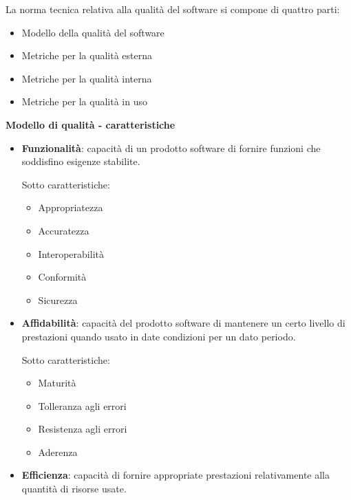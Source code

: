 		La norma tecnica relativa alla qualità del software si compone di quattro parti:
		\begin{itemize}
		
			\item Modello della qualità del software
			\item Metriche per la qualità esterna
			\item Metriche per la qualità interna
			\item Metriche per la qualità in uso
			
		\end{itemize}
		
		\textbf{Modello di qualità - caratteristiche}
		
		\begin{itemize}
		
			\item \textbf{Funzionalità}: capacità di un prodotto software di fornire funzioni che soddisfino esigenze stabilite.
			
			Sotto caratteristiche:
			
			\begin{itemize}
			
				\item Appropriatezza
				\item Accuratezza
				\item Interoperabilità
				\item Conformità
				\item Sicurezza

			\end{itemize}

		\item \textbf{Affidabilità}: capacità del prodotto software di mantenere un certo livello di prestazioni quando usato in date condizioni per un dato periodo.
		
			Sotto caratteristiche:
			
			\begin{itemize}
			
				\item Maturità
				\item Tolleranza agli errori
				\item Resistenza agli errori
				\item Aderenza

			\end{itemize}

		\item \textbf{Efficienza}: capacità di fornire appropriate prestazioni relativamente alla quantità di risorse usate.
		

\end{itemize}
